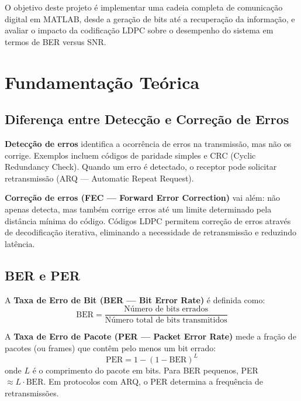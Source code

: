 \documentclass[conference]{IEEEtran}
\begin{document}
O objetivo deste projeto é implementar uma cadeia completa de comunicação digital em MATLAB, desde a geração de bits até a recuperação da informação, e avaliar o impacto da codificação LDPC sobre o desempenho do sistema em termos de BER versus SNR.

\section{Fundamentação Teórica}

\subsection{Diferença entre Detecção e Correção de Erros}

\textbf{Detecção de erros} identifica a ocorrência de erros na transmissão, mas não os corrige. Exemplos incluem códigos de paridade simples e CRC (Cyclic Redundancy Check). Quando um erro é detectado, o receptor pode solicitar retransmissão (ARQ --- Automatic Repeat Request).

\textbf{Correção de erros (FEC --- Forward Error Correction)} vai além: não apenas detecta, mas também corrige erros até um limite determinado pela distância mínima do código. Códigos LDPC permitem correção de erros através de decodificação iterativa, eliminando a necessidade de retransmissão e reduzindo latência.

\subsection{BER e PER}

A \textbf{Taxa de Erro de Bit (BER --- Bit Error Rate)} é definida como:
\begin{equation}
    \text{BER} = \frac{\text{Número de bits errados}}{\text{Número total de bits transmitidos}}
\end{equation}

A \textbf{Taxa de Erro de Pacote (PER --- Packet Error Rate)} mede a fração de pacotes (ou frames) que contêm pelo menos um bit errado:
\begin{equation}
    \text{PER} = 1 - (1 - \text{BER})^L
\end{equation}
onde $L$ é o comprimento do pacote em bits. Para BER pequenos, PER $\approx L \cdot \text{BER}$. Em protocolos com ARQ, o PER determina a frequência de retransmissões.
\end{document}
